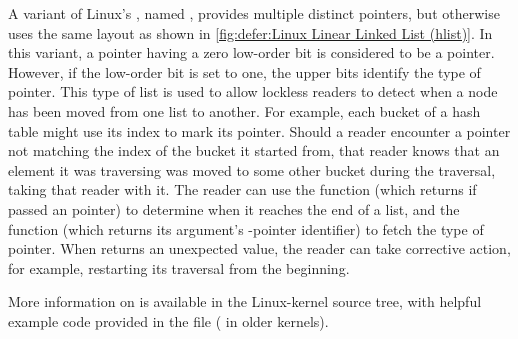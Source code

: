 A variant of Linux's , named , provides multiple
distinct  pointers, but otherwise uses the same layout as shown in
\cref{fig:defer:Linux Linear Linked List (hlist)}.
In this variant, a  pointer having a zero low-order bit is
considered to be a pointer.
However, if the low-order bit is set to one, the upper bits identify
the type of  pointer.
This type of list is used to allow lockless readers to detect when a
node has been moved from one list to another.
For example, each bucket of a hash table might use its index to mark
its  pointer.
Should a reader encounter a  pointer not matching the index of
the bucket it started from, that reader knows that an element it was
traversing was moved to some other bucket during the traversal, taking
that reader with it.
The reader can use the  function (which returns 
if passed an   pointer) to determine when
it reaches the end of a list, and the  function
(which returns its argument's -pointer identifier) to fetch
the type of  pointer.
When  returns an unexpected value, the reader
can take corrective action, for example, restarting its traversal from
the beginning.

\QuickQuizEnd

More information on  is available in the Linux-kernel
source tree, with helpful example code provided in the
 file ( in older kernels).

